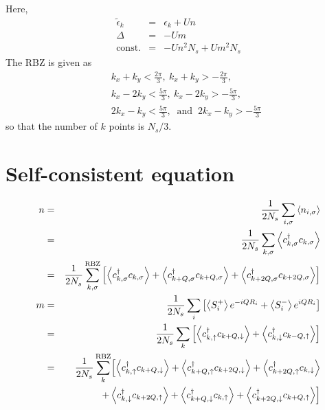 \documentclass[a4paper,11pt]{article}
\begin{document}
Here,
\begin{eqnarray}
 \tilde\epsilon_k &=& \epsilon_{k} + Un
\\
 \Delta &=& -Um
\\
 \mathrm{const.} &=& -U n^2 N_s + U m^2 N_s
\end{eqnarray}
The RBZ is given as
\begin{eqnarray}
&& k_x + k_y < \frac{2\pi}{3},~
   k_x + k_y > -\frac{2\pi}{3},~ \\
&& k_x - 2k_y < \frac{5\pi}{3},~
   k_x - 2k_y > -\frac{5\pi}{3},~ \\
&& 2k_x - k_y < \frac{5\pi}{3},~ \mbox{~and~}~
   2k_x - k_y > -\frac{5\pi}{3}
\end{eqnarray}
so that the number of $k$ points is $N_s/3$.


\section{Self-consistent equation}

\begin{eqnarray}
 n
 &=& \frac{1}{2N_s} \sum_{i,\sigma} \left< n_{i,\sigma} \right>
\nonumber
\\
 &=& \frac{1}{2N_s} \sum_{k,\sigma} \left< c_{k,\sigma}^{\dagger} c_{k,\sigma} \right>
\nonumber
\\
  &=& \frac{1}{2N_s} \sum_{k,\sigma}^{\mathrm{RBZ}} \left[
       \left< c_{k,\sigma}^{\dagger} c_{k,\sigma} \right>
       + \left< c_{k+Q,\sigma}^{\dagger} c_{k+Q,\sigma} \right>
       + \left< c_{k+2Q,\sigma}^{\dagger} c_{k+2Q,\sigma} \right>
      \right]
\\
 m
 &=& \frac{1}{2N_s} \sum_{i} \left[
      \left< S_{i}^{+} \right> e^{-iQR_i}
      + \left< S_{i}^{-} \right> e^{iQR_i}
     \right]
\nonumber
\\
 &=& \frac{1}{2N_s} \sum_{k} \left[
      \left< c_{k,\uparrow}^{\dagger} c_{k+Q,\downarrow} \right>
      + \left< c_{k,\downarrow}^{\dagger} c_{k-Q,\uparrow} \right>
     \right]
\nonumber
\\
 &=& \frac{1}{2N_s} \sum_{k}^{\mathrm{RBZ}} \Bigl[
      \left< c_{k,\uparrow}^{\dagger} c_{k+Q,\downarrow} \right>
      + \left< c_{k+Q,\uparrow}^{\dagger} c_{k+2Q,\downarrow} \right>
      + \left< c_{k+2Q,\uparrow}^{\dagger} c_{k,\downarrow} \right>
\nonumber
\\
 &&
      + \left< c_{k,\downarrow}^{\dagger} c_{k+2Q,\uparrow} \right>
      + \left< c_{k+Q,\downarrow}^{\dagger} c_{k,\uparrow} \right>
      + \left< c_{k+2Q,\downarrow}^{\dagger} c_{k+Q,\uparrow} \right>
     \Bigr]
\end{eqnarray}
\end{document}
